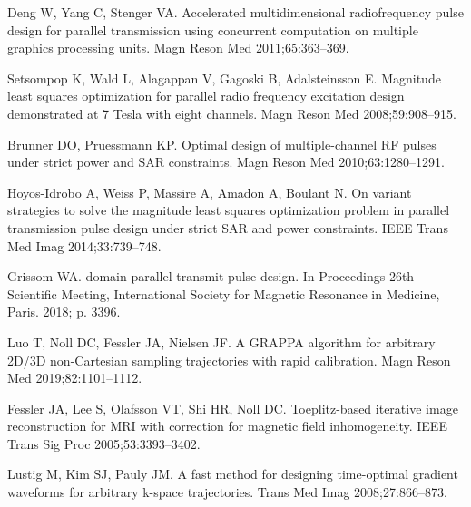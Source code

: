 \documentclass[11pt]{article}
\begin{document}
\begin{thebibliography}{10}
Deng W, Yang C, Stenger VA.
\newblock Accelerated multidimensional radiofrequency pulse design for parallel
  transmission using concurrent computation on multiple graphics processing
  units.
\newblock Magn Reson Med 2011;\hspace{0pt}65:363--369.

Setsompop K, Wald L, Alagappan V, Gagoski B, Adalsteinsson E.
\newblock Magnitude least squares optimization for parallel radio frequency
  excitation design demonstrated at 7 {Tesla} with eight channels.
\newblock Magn Reson Med 2008;\hspace{0pt}59:908--915.

Brunner DO, Pruessmann KP.
\newblock Optimal design of multiple-channel {RF} pulses under strict power and
  {SAR} constraints.
\newblock Magn Reson Med 2010;\hspace{0pt}63:1280--1291.

Hoyos-Idrobo A, Weiss P, Massire A, Amadon A, Boulant N.
\newblock On variant strategies to solve the magnitude least squares
  optimization problem in parallel transmission pulse design under strict {SAR}
  and power constraints.
\newblock IEEE Trans Med Imag 2014;\hspace{0pt}33:739--748.

Grissom WA.
 domain parallel transmit pulse design.
\newblock In Proceedings 26th Scientific Meeting, International Society for
  Magnetic Resonance in Medicine, Paris. 2018;\hspace{0pt} p. 3396.

Luo T, Noll DC, Fessler JA, Nielsen JF.
\newblock A {GRAPPA} algorithm for arbitrary {2D/3D} non-{Cartesian} sampling
  trajectories with rapid calibration.
\newblock Magn Reson Med 2019;\hspace{0pt}82:1101--1112.

Fessler JA, Lee S, Olafsson VT, Shi HR, Noll DC.
\newblock Toeplitz-based iterative image reconstruction for {MRI} with
  correction for magnetic field inhomogeneity.
\newblock IEEE Trans Sig Proc 2005;\hspace{0pt}53:3393--3402.

Lustig M, Kim SJ, Pauly JM.
\newblock A fast method for designing time-optimal gradient waveforms for
  arbitrary k-space trajectories.
 Trans Med Imag 2008;\hspace{0pt}27:866--873.


\end{thebibliography}
\end{document}
